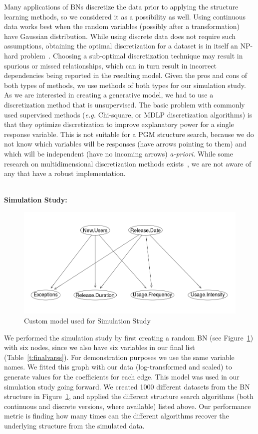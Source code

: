 \documentclass[smallextended]{svjour3}       %
\begin{document}
Many applications of BNs discretize the data prior to applying
the structure learning methods, so we considered it as a possibility as well.
Using continuous data works best
when the random variables (possibly after a transformation) 
have Gaussian distribution. While using
discrete data does not require such assumptions, obtaining the optimal
discretization for a dataset is in itself an NP-hard
problem~\cite{chlebus1998finding}. Choosing a
sub-optimal discretization technique may result in spurious or
missed relationships, which can in turn result in incorrect
dependencies being reported in the resulting model. Given the pros
and cons of both types of methods, we use methods of both types for
our simulation study. As we are interested in creating a generative model, we had to
use a discretization method that is unsupervised. The basic problem
with commonly used supervised methods (\textit{e.g.} Chi-square, or
MDLP discretization algorithms) is that they optimize
discretization to improve explanatory power for 
a single response variable. This is not suitable for a 
PGM structure search, because we do
not know  which variables will be responses (have arrows
pointing to them) and which will be independent (have no incoming
arrows) {\em a-priori}. While some research on multidimensional
discretization methods exists~\cite{perez2006supervised},
we are not aware of any that have a robust implementation.

\noindent\\
\textbf{Simulation Study:}\\
\begin{figure}
\centering
\includegraphics[width=\linewidth]{custom}
\caption{Custom model used for Simulation Study}
\label{fig:theory}
\end{figure}
We performed the simulation study by first creating 
a random BN (see Figure~\ref{fig:theory}) with 
six nodes, since we also have six variables in our final list (Table~\ref{t:finalvarss}).
For demonstration purposes we use the same variable names. 
We fitted this graph with our data (log-transformed and scaled) to generate values for the coefficients 
for each edge. This model was used in our simulation study going forward.
We created 1000 different datasets from the BN structure in Figure~\ref{fig:theory},
and applied the different structure search algorithms 
(both continuous and discrete versions, where available) listed above. Our performance metric
is finding how many times can the different algorithms recover the 
underlying structure from the simulated data. 
\end{document}
